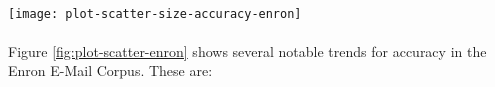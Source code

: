 \paragraph*{}
	\begin{sidewaysfigure}[htbp!]
		\begin{center}
		\centering
		\texttt{[image: plot-scatter-size-accuracy-enron]}
		\caption{Scatter-Plot of Enron Email Corpus Tests}
		\label{fig:plot-scatter-enron}
		\end{center}
	\end{sidewaysfigure}
	
\paragraph*{} Figure \ref{fig:plot-scatter-enron} shows several notable trends for accuracy in the Enron E-Mail Corpus.  These are:
